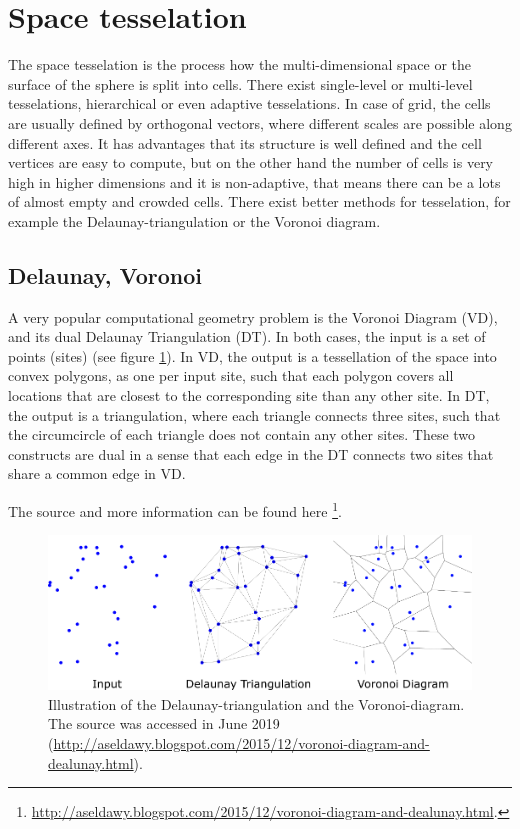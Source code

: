 \documentclass[12pt]{article}
\theoremstyle{plain}
\begin{document}

\pagebreak
\section{Space tesselation}

The space tesselation is the process how the multi-dimensional space or the surface of the sphere is split into cells. There exist single-level or multi-level tesselations, hierarchical or even adaptive tesselations. In case of grid, the cells are usually defined by orthogonal vectors, where different scales are possible along different axes. It has advantages that its structure is well defined and the cell vertices are easy to compute, but on the other hand the number of cells is very high in higher dimensions and it is non-adaptive, that means there can be a lots of almost empty and crowded cells. There exist better methods for tesselation, for example the Delaunay-triangulation or the Voronoi diagram.

\subsection{Delaunay, Voronoi}

A very popular computational geometry problem is the Voronoi Diagram (VD), and its dual Delaunay Triangulation (DT). In both cases, the input is a set of points (sites) (see figure \ref{delavoro}). In VD, the output is a tessellation of the space into convex polygons, as one per input site, such that each polygon covers all locations that are closest to the corresponding site than any other site. In DT, the output is a triangulation, where each triangle connects three sites, such that the circumcircle of each triangle does not contain any other sites. These two constructs are dual in a sense that each edge in the DT connects two sites that share a common edge in VD.

The source and more information can be found here \footnote{\url{http://aseldawy.blogspot.com/2015/12/voronoi-diagram-and-dealunay.html}.}.

\begin{figure}[h!]
    \centering
	\includegraphics[width=.9\linewidth]{media/delavoro.png}
	\caption{Illustration of the Delaunay-triangulation and the Voronoi-diagram. The source was accessed in June 2019 (\url{http://aseldawy.blogspot.com/2015/12/voronoi-diagram-and-dealunay.html}).}
	\label{delavoro}
\end{figure}
\end{document}
